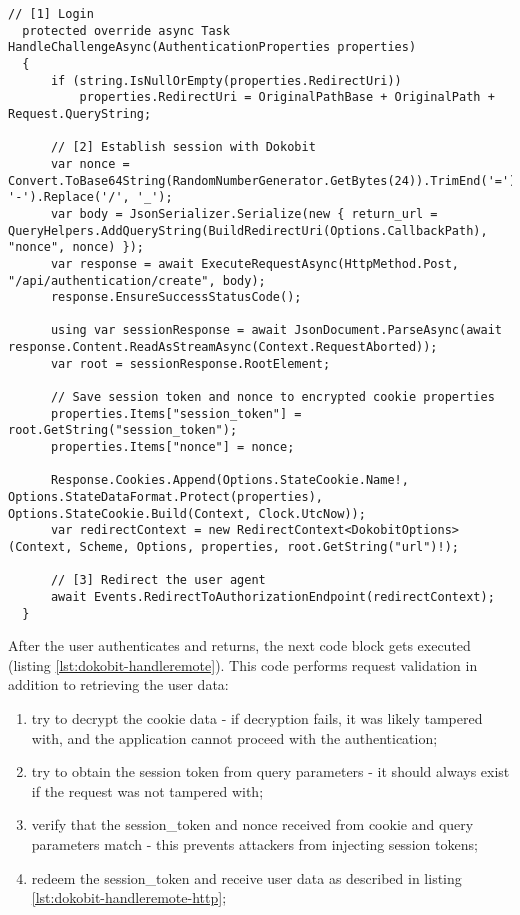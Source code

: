 \begin{lstlisting}[caption={Handling Dokobit session creation}, label={lst:dokobit-challenge}]
  // [1] Login
  protected override async Task HandleChallengeAsync(AuthenticationProperties properties)
  {
      if (string.IsNullOrEmpty(properties.RedirectUri))
          properties.RedirectUri = OriginalPathBase + OriginalPath + Request.QueryString;

      // [2] Establish session with Dokobit
      var nonce = Convert.ToBase64String(RandomNumberGenerator.GetBytes(24)).TrimEnd('=').Replace('+', '-').Replace('/', '_');
      var body = JsonSerializer.Serialize(new { return_url = QueryHelpers.AddQueryString(BuildRedirectUri(Options.CallbackPath), "nonce", nonce) });
      var response = await ExecuteRequestAsync(HttpMethod.Post, "/api/authentication/create", body);
      response.EnsureSuccessStatusCode();

      using var sessionResponse = await JsonDocument.ParseAsync(await response.Content.ReadAsStreamAsync(Context.RequestAborted));
      var root = sessionResponse.RootElement;

      // Save session token and nonce to encrypted cookie properties
      properties.Items["session_token"] = root.GetString("session_token");
      properties.Items["nonce"] = nonce;

      Response.Cookies.Append(Options.StateCookie.Name!, Options.StateDataFormat.Protect(properties), Options.StateCookie.Build(Context, Clock.UtcNow));
      var redirectContext = new RedirectContext<DokobitOptions>(Context, Scheme, Options, properties, root.GetString("url")!);

      // [3] Redirect the user agent
      await Events.RedirectToAuthorizationEndpoint(redirectContext);
  }
\end{lstlisting}

After the user authenticates and returns, the next code block gets executed (listing \ref{lst:dokobit-handleremote}). This code performs request validation in addition to retrieving the user data:

\begin{enumerate}
  \item try to decrypt the cookie data - if decryption fails, it was likely tampered with, and the application cannot proceed with the authentication;
  \item try to obtain the session token from query parameters - it should always exist if the request was not tampered with;
  \item verify that the session\_token and nonce received from cookie and query parameters match - this prevents attackers from injecting session tokens;
  \item redeem the session\_token and receive user data as described in listing \ref{lst:dokobit-handleremote-http};
\end{enumerate}

